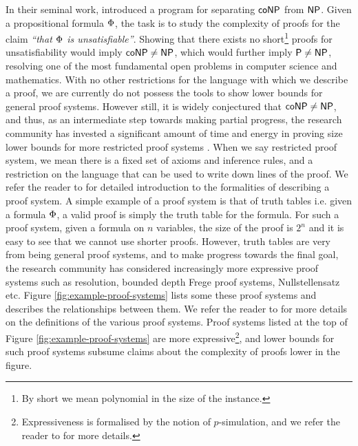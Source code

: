 \documentclass[11pt]{article}
\begin{document}
In their seminal work, \citet{cook1979relative} introduced a program for separating $\mathsf{coNP}$ from $\mathsf{NP}$.
Given a propositional formula $\Phi$, the task is to study the complexity of proofs for the claim \textit{``that $\Phi$ is unsatisfiable''}.
Showing that there exists no short\footnote{By short we mean polynomial in the size of the instance.} proofs for unsatisfiability would imply $\mathsf{coNP} \neq \mathsf{NP}$, which would further imply $\mathsf{P} \neq \mathsf{NP}$, resolving one of the most fundamental open problems in computer science and mathematics.
With no other restrictions for the language with which we describe a proof, we are currently do not possess the tools to show lower bounds for general proof systems. 
However still, it is widely conjectured that $\mathsf{coNP} \neq \mathsf{NP}$, and thus, as an intermediate step towards making partial progress, the research community has invested a significant amount of time and energy in proving size lower bounds for more restricted proof systems \citep{blake1937canonical,razborov1998lower, impagliazzo1999lower, alekhnovich2001lower, buss1999linear}.
When we say restricted proof system, we mean there is a fixed set of axioms and inference rules, and a restriction on the language that can be used to write down lines of the proof. We refer the reader to \citep{krajicek2019proof} for detailed introduction to the formalities of describing a proof system.
A simple example of a proof system is that of truth tables i.e. given a formula $\Phi$, a valid proof is simply the truth table for the formula.
For such a proof system, given a formula on $n$ variables, the size of the proof is $2^n$ and it is easy to see that we cannot use shorter proofs.
However, truth tables are very from being general proof systems, and to make progress towards the final goal, the research community has considered increasingly more expressive proof systems such as resolution, bounded depth Frege proof systems, Nullstellensatz etc.
Figure \ref{fig:example-proof-systems} lists some these proof systems and describes the relationships between them.
We refer the reader to \citep{krajicek2019proof, ProofComplexityLecNotesPaul} for more details on the definitions of the various proof systems.
Proof systems listed at the top of Figure \ref{fig:example-proof-systems} are more expressive\footnote{Expressiveness is formalised by the notion of $p$-simulation, and we refer the reader to \citep[Definition 1.6]{ProofComplexityLecNotes} for more details.}, and lower bounds for such proof systems subsume claims about the complexity of proofs lower in the figure.\par
\end{document}

